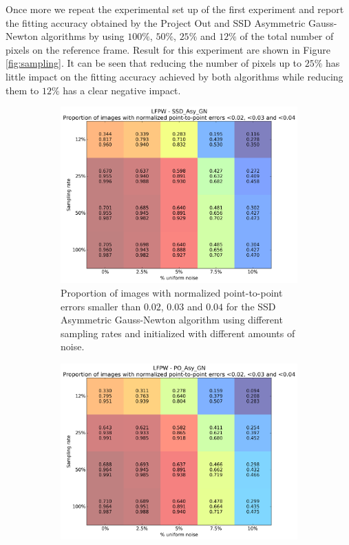 Once more we repeat the experimental set up of the first experiment and report the fitting accuracy obtained by the Project Out and SSD Asymmetric Gauss-Newton algorithms by using $100\%$, $50\%$, $25\%$ and $12\%$ of the total number of pixels on the reference frame.
Result for this experiment are shown in Figure \ref{fig:sampling}. It can be seen that reducing the number of pixels up to $25\%$ has little impact on the fitting accuracy achieved by both algorithms while reducing them to $12\%$ has a clear negative impact.

\begin{figure}[h!]
	\centering
	\begin{subfigure}{0.48\textwidth}
	    \includegraphics[width=\textwidth]{experiments/sampling/sampling_vs_noise_ssd_asy_gn.png}
	    \caption{Proportion of images with normalized point-to-point errors smaller than $0.02$, $0.03$ and $0.04$ for the SSD Asymmetric Gauss-Newton algorithm using different sampling rates and initialized with different amounts of noise.}
	    \label{fig:sampling_vs_noise_ssd_asy_gn}
	\end{subfigure}
	\hfill
	\begin{subfigure}{0.48\textwidth}
	    \includegraphics[width=\textwidth]{experiments/sampling/sampling_vs_noise_po_asy_gn.png}

\end{subfigure}
\end{figure}
